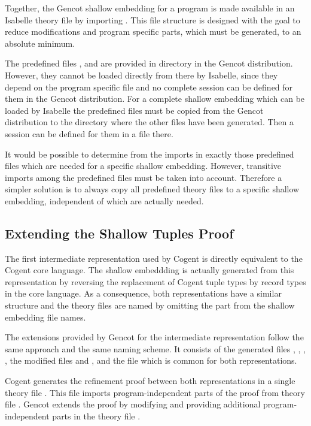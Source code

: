 Together, the Gencot shallow embedding for a program  is made available in an Isabelle theory file by importing
. This file structure is designed with the goal to reduce modifications and program 
specific parts, which must be generated, to an absolute minimum.

The predefined files ,  and  are provided in 
directory  in the Gencot distribution. However, they cannot be loaded directly from there by Isabelle, 
since they depend on the program specific file  and no complete session can be defined for 
them in the Gencot distribution. For a complete shallow embedding which can be loaded by Isabelle the predefined
files must be copied from the Gencot distribution to the directory where the other files have been generated. Then 
a session can be defined for them in a  file there.

It would be possible to determine from the imports in  exactly those predefined
files which are needed for a specific shallow embedding. However, transitive imports among the predefined files
must be taken into account. Therefore a simpler solution is to always copy all predefined theory files to a 
specific shallow embedding, independent of which are actually needed.

\subsection{Extending the Shallow Tuples Proof}
\label{impl-isabelle-reftuples}

The first intermediate representation used by Cogent is directly equivalent to the Cogent core language. The shallow 
embeddding is actually generated from this representation by reversing the replacement of Cogent tuple types by record types
in the core language. As a consequence, both representations have a similar structure and the theory files are named
by omitting the  part from the shallow embedding file names.

The extensions provided by Gencot for the intermediate representation follow the same approach and the same naming scheme.
It consists of the generated files , , , 
, the modified files  and , 
and the file  which is common for both representations.

Cogent generates the refinement proof between both representations in a single theory file .
This file imports program-independent parts of the proof from theory file . Gencot extends the 
proof by modifying  and providing additional program-independent parts in the theory 
file .
